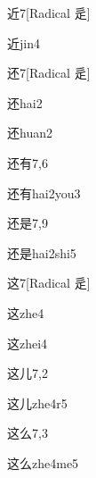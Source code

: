 \begin{entry}{近}{7}[Radical 辵]
  \begin{phonetics}{近}{jin4}
  \end{phonetics}
\end{entry}

\begin{entry}{还}{7}[Radical 辵]
  \begin{phonetics}{还}{hai2}
  \end{phonetics}
  \begin{phonetics}{还}{huan2}
  \end{phonetics}
\end{entry}

\begin{entry}{还有}{7,6}
  \begin{phonetics}{还有}{hai2you3}
  \end{phonetics}
\end{entry}

\begin{entry}{还是}{7,9}
  \begin{phonetics}{还是}{hai2shi5}
  \end{phonetics}
\end{entry}

\begin{entry}{这}{7}[Radical 辵]
  \begin{phonetics}{这}{zhe4}
  \end{phonetics}
  \begin{phonetics}{这}{zhei4}
  \end{phonetics}
\end{entry}

\begin{entry}{这儿}{7,2}
  \begin{phonetics}{这儿}{zhe4r5}
  \end{phonetics}
\end{entry}

\begin{entry}{这么}{7,3}
  \begin{phonetics}{这么}{zhe4me5}
  \end{phonetics}
\end{entry}

